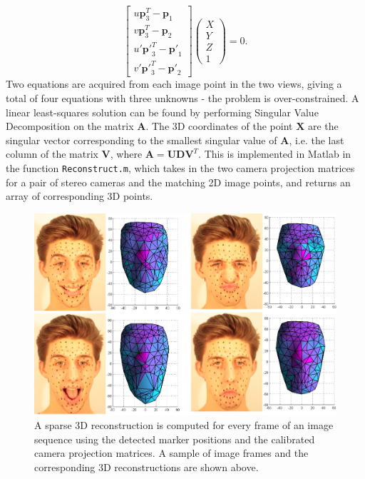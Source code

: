 \documentclass[11pt]{report}
\newcommand{\vect}[1]{\mathbf{#1}}
\begin{document}
\begin{equation}
\begin{bmatrix}
       u\vect{p}_3^T - \vect{p}_1 \\[0.3em]
       v\vect{p}_3^T - \vect{p}_2 \\[0.3em]
       u' \vect{p'}_3^T - \vect{p'}_1 \\[0.3em]
       v' \vect{p'}_3^T - \vect{p'}_2
\end{bmatrix}
\left(\!
    \begin{array}{c}
      X \\
      Y \\
      Z \\
      1
    \end{array}
  	\!\right) = 0.
\end{equation}
Two equations are acquired from each image point in the two views, giving a total of four equations with three unknowns - the problem is over-constrained. A linear least-squares solution can be found by performing Singular Value Decomposition on the matrix $\vect{A}$. The 3D coordinates of the point $\vect{X}$ are the singular vector corresponding to the smallest singular value of $\vect{A}$, i.e. the last column of the matrix $\vect{V}$, where $\vect{A} = \vect{UDV}^T$. This is implemented in Matlab in the function \texttt{Reconstruct.m}, which takes in the two camera projection matrices for a pair of stereo cameras and the matching 2D image points, and returns an array of corresponding 3D points.

\begin{figure}[htbp!]
\centering
\includegraphics[width=\textwidth]{img/faces}
	\caption{A sparse 3D reconstruction is computed for every frame of an image sequence using the detected marker positions and the calibrated camera projection matrices. A sample of image frames and the corresponding 3D reconstructions are shown above.}
	\label{fig:faces}
\end{figure}
\end{document}
